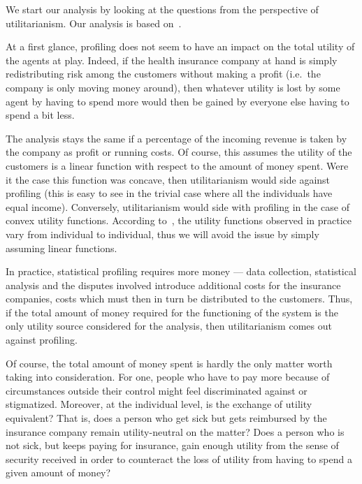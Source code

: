 We start our analysis by looking at the questions from the perspective of utilitarianism.  Our analysis is based on~\cite{odihi20}.

At a first glance, profiling does not seem to have an impact on the total utility of the agents at play. Indeed, if the health insurance company at hand is simply redistributing risk among the customers without making a profit (i.e.~the company is only moving money around), then whatever utility is lost by some agent by having to spend more would then be gained by everyone else having to spend a bit less.

The analysis stays the same if a percentage of the incoming revenue is taken by the company as profit or running costs. Of course, this assumes the utility of the customers is a linear function with respect to the amount of money spent. Were it the case this function was concave, then utilitarianism would side against profiling (this is easy to see in the trivial case where all the individuals have equal income). Conversely, utilitarianism would side with profiling in the case of convex utility functions. According to~\cite{prospect_theory}, the utility functions observed in practice vary from individual to individual, thus we will avoid the issue by simply assuming linear functions.

In practice, statistical profiling requires more money — data collection, statistical analysis and the disputes involved introduce additional costs for the insurance companies, costs which must then in turn be distributed to the customers. Thus, if the total amount of money required for the functioning of the system is the only utility source considered for the analysis, then utilitarianism comes out against profiling.

Of course, the total amount of money spent is hardly the only matter worth taking into consideration. For one, people who have to pay more because of circumstances outside their control might feel discriminated against or stigmatized. Moreover, at the individual level, is the exchange of utility equivalent? That is, does a person who get sick but gets reimbursed by the insurance company remain utility-neutral on the matter? Does a person who is not sick, but keeps paying for insurance, gain enough utility from the sense of security received in order to counteract the loss of utility from having to spend a given amount of money?

